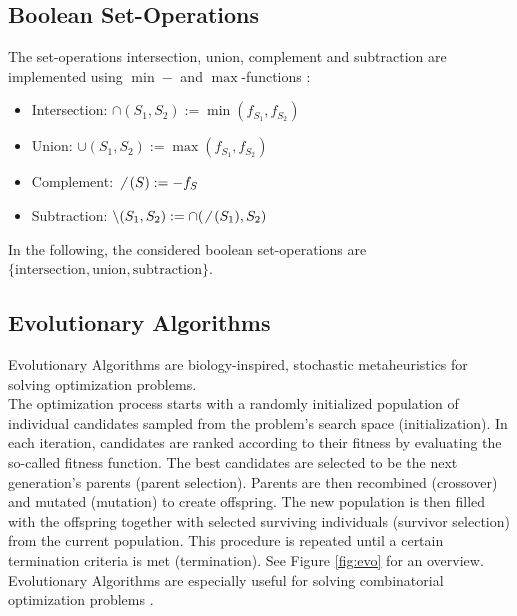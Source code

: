 
\subsection{Boolean Set-Operations}
The set-operations intersection, union, complement and subtraction are implemented using $\min-$ and $\max$-functions \cite{ricci197constgeo}: 
\begin{itemize}
	\item Intersection: $\cap(S_1,S_2) := \min(f_{S_1}, f_{S_2})$
	\item Union: $\cup(S_1,S_2) := \max(f_{S_1}, f_{S_2})$
	\item Complement: $\not \enskip(S) := -f_S$
	\item Subtraction: $\setminus(S_1,S_2) := \cap(\not \enskip(S_1), S_2)$%
\end{itemize}
In the following, the considered boolean set-operations are $\{\text{intersection}, \text{union}, \text{subtraction}\}$.
\subsection{Evolutionary Algorithms} 
Evolutionary Algorithms are biology-inspired, stochastic metaheuristics for solving optimization problems.
\\
The optimization process starts with a randomly initialized population of individual candidates sampled from the problem's search space (initialization).
In each iteration, candidates are ranked according to their fitness by evaluating the so-called fitness function.
The best candidates are selected to be the next generation's parents (parent selection).
Parents are then recombined (crossover) and mutated (mutation) to create offspring. 
The new population is then filled with the offspring together with selected surviving individuals (survivor selection) from the current population.
This procedure is repeated until a certain termination criteria is met (termination). 
See Figure \ref{fig:evo} for an overview.
\\
Evolutionary Algorithms are especially useful for solving combinatorial optimization problems \cite{eiben2003introduction}.

